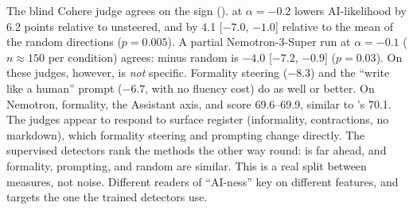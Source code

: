 The blind Cohere judge agrees on the sign (). \dai at $\alpha=-0.2$ lowers AI-likelihood by 6.2 points relative to unsteered, and by 4.1 [$-7.0$, $-1.0$] relative to the mean of the random directions ($p=0.005$). A partial Nemotron-3-Super run at $\alpha=-0.1$ ($n\approx150$ per condition) agrees: \dai minus random is $-4.0$ [$-7.2$, $-0.9$] ($p=0.03$).
On these judges, however, \dai is {\em not} specific. Formality steering ($-8.3$) and the ``write like a human'' prompt ($-6.7$, with no fluency cost) do as well or better. On Nemotron, formality, the Assistant axis, and \daiperp score 69.6--69.9, similar to \dai's 70.1.
The judges appear to respond to surface register (informality, contractions, no markdown), which formality steering and prompting change directly. The supervised detectors rank the methods the other way round: \dai is far ahead, and formality, prompting, and random are similar. This is a real split between measures, not noise. Different readers of ``AI-ness'' key on different features, and \dai targets the one the trained detectors use.
